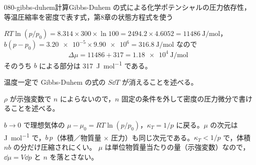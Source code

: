 \documentclass[uplatex,dvipdfmx,a4paper,11pt]{jsarticle}
\begin{document}
\begin{mondai}{080-gibbs-duhem}{計算}{Gibbs-Duhem の式による化学ポテンシャルの圧力依存性，等温圧縮率を密度で表す式，第8章の状態方程式を使う}
\begin{tadashii}
 $RT\ln(p/p_{0}) = 8.314 \times 300 \times \ln 100 = 2494.2 \times 4.6052 = \qty{11486}{\joule\per\mole}$，$b(p - p_{0}) = \num{3.20e-5} \times \num{9.90e6} = \qty{316.8}{\joule\per\mole}$ なので
\[ \Delta\mu = 11486 + 317 = \qty{1.18e4}{\joule\per\mole} \]
そのうち $b$ による部分は \qty{317}{\joule\per\mole} である。
\begin{ronten}
  \item {} 温度一定で Gibbs-Duhem の式の $S\dd T$ が消えることを述べる。
  \item {} $\rho$ が示強変数で $n$ によらないので，$n$ 固定の条件を外して密度の圧力微分で書けることを述べる。
\end{ronten}
\kenzan $b \to 0$ で理想気体の $\mu - \mu_{0} = RT\ln(p/p_{0})$，$\kappa_{T} = 1/p$ に戻る。$\mu$ の次元は \unit{\joule\per\mole} で，$b\,p$（体積／物質量 × 圧力）も同じ次元である。$\kappa_{T} < 1/p$ で，体積 $nb$ の分だけ圧縮されにくい。
\tsumazuki $\mu$ は単位物質量当たりの量（示強変数）なので，$\dd\mu = V\dd p$ と $n$ を落とさない。
\end{tadashii}
\end{mondai}

\noteowari
\end{document}
